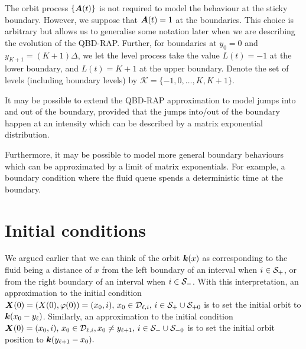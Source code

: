 The orbit process \(\{\boldsymbol A(t)\}\) is not required to model the behaviour at the sticky boundary. However, we suppose that \(\boldsymbol A(t)=1\) at the boundaries. This choice is arbitrary but allows us to generalise some notation later when we are describing the evolution of the QBD-RAP. Further, for boundaries at \(y_0=0\) and \(y_{K+1} = (K+1)\Delta\), we let the level process take the value \(L(t)=-1\) at the lower boundary, and \(L(t)=K+1\) at the upper boundary. Denote the set of levels (including boundary levels) by \(\mathcal K = \{-1,0,\dots,K,K+1\}\). 

\begin{rem}
	It may be possible to extend the QBD-RAP approximation to model jumps into and out of the boundary, provided that the jumps into/out of the boundary happen at an intensity which can be described by a matrix exponential distribution. 
	
	Furthermore, it may be possible to model more general boundary behaviours which can be approximated by a limit of matrix exponentials. For example, a boundary condition where the fluid queue spends a deterministic time at the boundary. 
\end{rem}

\section{Initial conditions}\label{sec: initial conditions}

We argued earlier that we can think of the orbit \(\boldsymbol k(x)\) as corresponding to the fluid being a distance of \(x\) from the left boundary of an interval when \(i\in\mathcal{S}_+\), or from the right boundary of an interval when \(i\in\mathcal{S}_-\). With this interpretation, an approximation to the initial condition \(\boldsymbol X(0) = (X(0),\varphi(0))=(x_0,i),\,x_0\in\mathcal D_{\ell,i},\,i\in\mathcal S_+\cup\mathcal{S}_{+0}\) is to set the initial orbit to \(\boldsymbol k(x_0-y_{\ell})\). Similarly, an approximation to the initial condition \(\boldsymbol X(0)=(x_0,i), \,x_0\in\mathcal D_{\ell,i}, x_0\neq y_{\ell+1},\,i\in\mathcal S_-\cup\mathcal{S}_{-0}\) is to set the initial orbit position to \(\boldsymbol k(y_{\ell+1}-x_0).\) 

